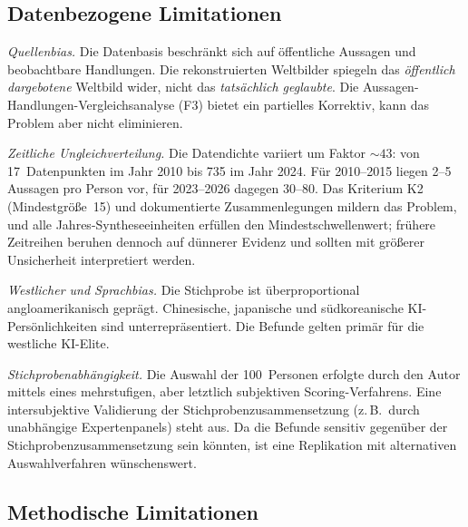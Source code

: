 \documentclass[12pt,a4paper]{article}
\begin{document}
\subsection{Datenbezogene Limitationen}

\emph{Quellenbias.} Die Datenbasis beschr\"ankt sich auf \"offentliche Aussagen und beobachtbare Handlungen. Die rekonstruierten Weltbilder spiegeln das \emph{\"offentlich dargebotene} Weltbild wider, nicht das \emph{tats\"achlich geglaubte}. Die Aussagen-Handlungen-Vergleichsanalyse (F3) bietet ein partielles Korrektiv, kann das Problem aber nicht eliminieren.

\emph{Zeitliche Ungleichverteilung.} Die Datendichte variiert um Faktor ${\sim}43$: von 17~Datenpunkten im Jahr 2010 bis 735 im Jahr 2024. F\"ur 2010--2015 liegen 2--5 Aussagen pro Person vor, f\"ur 2023--2026 dagegen 30--80. Das Kriterium K2 (Mindestgr\"o\ss{}e~15) und dokumentierte Zusammenlegungen mildern das Problem, und alle Jahres-Syntheseeinheiten erf\"ullen den Mindestschwellenwert; fr\"uhere Zeitreihen beruhen dennoch auf d\"unnerer Evidenz und sollten mit gr\"o\ss{}erer Unsicherheit interpretiert werden.

\emph{Westlicher und Sprachbias.} Die Stichprobe ist \"uberproportional angloamerikanisch gepr\"agt. Chinesische, japanische und s\"udkoreanische KI-Pers\"onlichkeiten sind unterrepr\"asentiert. Die Befunde gelten prim\"ar f\"ur die westliche KI-Elite.

\emph{Stichprobenabh\"angigkeit.} Die Auswahl der 100~Personen erfolgte durch den Autor mittels eines mehrstufigen, aber letztlich subjektiven Scoring-Verfahrens. Eine intersubjektive Validierung der Stichprobenzusammensetzung (z.\,B.\ durch unabh\"angige Expertenpanels) steht aus. Da die Befunde sensitiv gegen\"uber der Stichprobenzusammensetzung sein k\"onnten, ist eine Replikation mit alternativen Auswahlverfahren w\"unschenswert.


\subsection{Methodische Limitationen}
\end{document}
